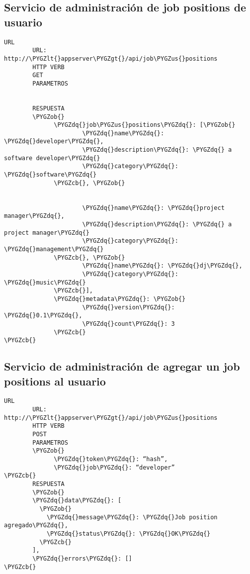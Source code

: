 \documentclass[a4paper,10pt,spanish]{sphinxmanual}
\def\PYGZus{\char`\_}
\def\PYGZob{\char`\{}
\def\PYGZcb{\char`\}}
\def\PYGZlt{\char`\<}
\def\PYGZgt{\char`\>}
\def\PYGZdq{\char`\"}
\begin{document}
\subsection{Servicio de administración de job positions de usuario}
\label{apiRest:servicio-de-administracion-de-job-positions-de-usuario}
\begin{Verbatim}[commandchars=\\\{\}]
URL
        URL: http://\PYGZlt{}appserver\PYGZgt{}/api/job\PYGZus{}positions
        HTTP VERB
        GET
        PARAMETROS


        RESPUESTA
        \PYGZob{}
              \PYGZdq{}job\PYGZus{}positions\PYGZdq{}: [\PYGZob{}
                      \PYGZdq{}name\PYGZdq{}: \PYGZdq{}developer\PYGZdq{},
                      \PYGZdq{}description\PYGZdq{}: \PYGZdq{} a software developer\PYGZdq{}
                      \PYGZdq{}category\PYGZdq{}: \PYGZdq{}software\PYGZdq{}
              \PYGZcb{}, \PYGZob{}


                      \PYGZdq{}name\PYGZdq{}: \PYGZdq{}project manager\PYGZdq{},
                      \PYGZdq{}description\PYGZdq{}: \PYGZdq{} a project manager\PYGZdq{}
                      \PYGZdq{}category\PYGZdq{}: \PYGZdq{}management\PYGZdq{}
              \PYGZcb{}, \PYGZob{}
                      \PYGZdq{}name\PYGZdq{}: \PYGZdq{}dj\PYGZdq{},
                      \PYGZdq{}category\PYGZdq{}: \PYGZdq{}music\PYGZdq{}
              \PYGZcb{}],
              \PYGZdq{}metadata\PYGZdq{}: \PYGZob{}
                      \PYGZdq{}version\PYGZdq{}: \PYGZdq{}0.1\PYGZdq{},
                      \PYGZdq{}count\PYGZdq{}: 3
              \PYGZcb{}
\PYGZcb{}
\end{Verbatim}


\subsection{Servicio de administración de agregar un job positions al usuario}
\label{apiRest:servicio-de-administracion-de-agregar-un-job-positions-al-usuario}
\begin{Verbatim}[commandchars=\\\{\}]
URL
        URL: http://\PYGZlt{}appserver\PYGZgt{}/api/job\PYGZus{}positions
        HTTP VERB
        POST
        PARAMETROS
        \PYGZob{}
              \PYGZdq{}token\PYGZdq{}: “hash”,
              \PYGZdq{}job\PYGZdq{}: “developer”
\PYGZcb{}
        RESPUESTA
        \PYGZob{}
        \PYGZdq{}data\PYGZdq{}: [
          \PYGZob{}
            \PYGZdq{}message\PYGZdq{}: \PYGZdq{}Job position agregado\PYGZdq{},
            \PYGZdq{}status\PYGZdq{}: \PYGZdq{}OK\PYGZdq{}
          \PYGZcb{}
        ],
        \PYGZdq{}errors\PYGZdq{}: []
\PYGZcb{}
\end{Verbatim}
\end{document}
